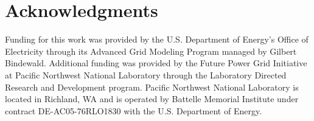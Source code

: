 \documentclass{acm_proc_article-sp}
\begin{document}
\section{Acknowledgments}
Funding for this work was provided by the U.S. Department of Energy's Office of
Electricity through its Advanced Grid Modeling Program managed by Gilbert
Bindewald.
Additional funding was provided by the Future Power Grid Initiative at Pacific
Northwest National Laboratory through the Laboratory Directed Research and
Development program.
Pacific Northwest National Laboratory is located in Richland, WA and is operated
by Battelle Memorial Institute under contract DE-AC05-76RLO1830 with the U.S.
Department of Energy.



\end{document}

